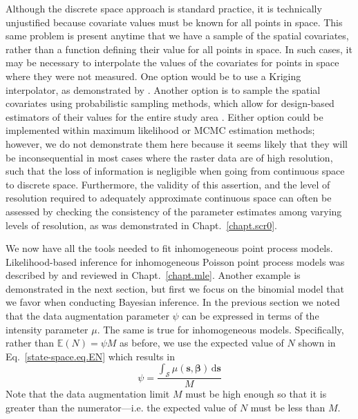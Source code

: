 Although the discrete space approach is standard practice, it is
technically unjustified because covariate values must be known for all
points in space. This same problem is present anytime that we have a
sample of the spatial covariates, rather than a function defining
their value for all points in space. In such cases, it may be necessary to
interpolate the values of the covariates for points in space where
they were not measured. One option would be to use a Kriging
interpolator, as demonstrated by \citet{rathbun:1996}. Another option
is to sample the spatial covariates using probabilistic sampling
methods, which allow for design-based estimators of their values for
the entire study area \citep{rathbun_etal:2007}. Either option could
be implemented within maximum likelihood or MCMC estimation methods;
however,
we do not demonstrate them here
because it seems likely that they will be inconsequential in most
cases where the raster data are of high resolution, such that the loss
of information is negligible when going from continuous space to
discrete space. Furthermore, the validity of this assertion, and the
level of resolution required to adequately approximate continuous
space can often be assessed by checking the consistency of the
parameter estimates among varying levels of resolution, as was
demonstrated in Chapt.~\ref{chapt.scr0}.

We now have all the tools needed to fit inhomogeneous point process
models. Likelihood-based inference for inhomogeneous Poisson point
process models was described by \citet{borchers_efford:2008} and
reviewed in Chapt.~\ref{chapt.mle}. Another example is demonstrated in
the next section, but first we focus on the binomial
model that we favor when conducting Bayesian inference. In the
previous section we noted that the data augmentation parameter $\psi$
can be expressed in terms of the intensity parameter $\mu$. The same
is true for inhomogeneous models. Specifically, rather than
$\mathbb{E}(N) = \psi M$ as before, we use the expected value of $N$ shown
in Eq.~\ref{state-space.eq.EN} which results in
\begin{equation}
\psi = \frac{\int_{\mathcal{S}} \mu(\mathbf{s},
  \bm{\beta}) \, \mathrm{d}\mathbf{s}}{M}
\label{state-space.eq.psimu}
\end{equation}
Note that the data augmentation limit $M$ must be high enough so that
it is greater than the numerator---i.e. the expected value
of $N$ must be less than $M$.

